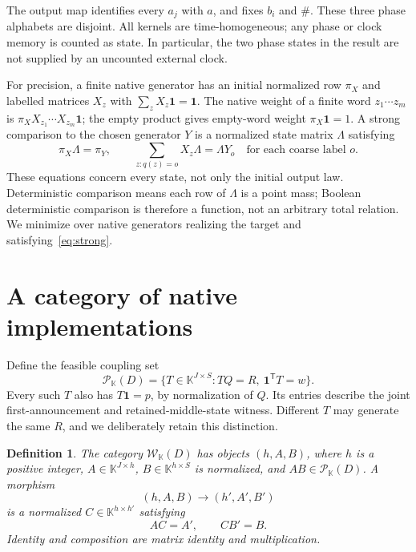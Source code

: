 \documentclass[11pt]{article}
\newcommand{\K}{\mathbb K}
\newcommand{\one}{\mathbf 1}
\newcommand{\W}{\mathcal W}
\newcommand{\Pcal}{\mathcal P}
\newtheorem{definition}[theorem]{Definition}
\theoremstyle{remark}
\begin{document}
The output map identifies every $a_j$ with $a$, and fixes $b_i$ and $\#$. These three phase alphabets are disjoint. All kernels are time-homogeneous; any phase or clock memory is counted as state. In particular, the two phase states in the result are not supplied by an uncounted external clock.

For precision, a finite native generator has an initial normalized row $\pi_X$ and labelled matrices $X_z$ with $\sum_zX_z\one=\one$. The native weight of a finite word $z_1\cdots z_m$ is $\pi_XX_{z_1}\cdots X_{z_m}\one$; the empty product gives empty-word weight $\pi_X\one=1$. A strong comparison to the chosen generator $Y$ is a normalized state matrix $\Lambda$ satisfying
\begin{equation}\label{eq:strong}
 \pi_X\Lambda=\pi_Y,\qquad
 \sum_{z:q(z)=o}X_z\Lambda=\Lambda Y_o
 \quad\text{for each coarse label }o.
\end{equation}
These equations concern every state, not only the initial output law. Deterministic comparison means each row of $\Lambda$ is a point mass; Boolean deterministic comparison is therefore a function, not an arbitrary total relation. We minimize over native generators realizing the target and satisfying~\eqref{eq:strong}.

\section{A category of native implementations}

Define the feasible coupling set
\begin{equation}\label{eq:feasible}
 \Pcal_\K(D)=\{T\in\K^{J\times S}:TQ=R,\ \one^{\mathsf T}T=w\}.
\end{equation}
Every such $T$ also has $T\one=p$, by normalization of $Q$. Its entries describe the joint first-announcement and retained-middle-state witness. Different $T$ may generate the same $R$, and we deliberately retain this distinction.

\begin{definition}\label{def:category}
The category $\W_\K(D)$ has objects $(h,A,B)$, where $h$ is a positive integer, $A\in\K^{J\times h}$, $B\in\K^{h\times S}$ is normalized, and $AB\in\Pcal_\K(D)$. A morphism
\[
 (h,A,B)\longrightarrow(h',A',B')
\]
is a normalized $C\in\K^{h\times h'}$ satisfying
\begin{equation}\label{eq:arrow}
 AC=A',\qquad CB'=B.
\end{equation}
Identity and composition are matrix identity and multiplication.
\end{definition}
\end{document}
